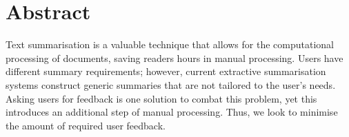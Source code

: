 \documentclass[ %
                    author={James Stephenson},
                supervisor={Dr. Edwin Simpson},
                    degree={MSc},
                     title={Project Plan: Bayesian Deep Learning For Extractive Test Summarisation},
                  subtitle={},
                      type={},
                      year={2022}]{../additions/dissertation}
\begin{document}
	
	
	
	
	
	\maketitle
	
	
	\frontmatter
	
	
	\tableofcontents
	
	
	
	\chapter*{Abstract}		

		Text summarisation is a valuable technique that allows for the computational processing of documents, saving readers hours in manual processing. Users have different summary requirements; however, current extractive summarisation systems construct generic summaries that are not tailored to the user's needs. Asking users for feedback is one solution to combat this problem, yet this introduces an additional step of manual processing. Thus, we look to minimise the amount of required user feedback.
\end{document}
